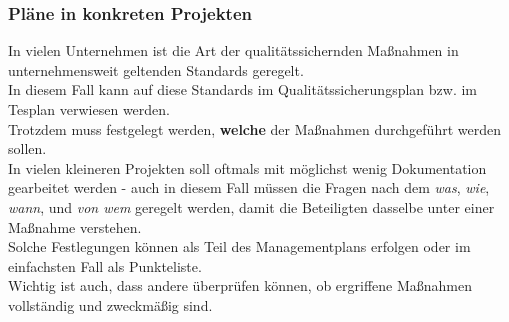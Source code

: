 \subsubsection*{Pläne in konkreten Projekten}
In vielen Unternehmen ist die Art der qualitätssichernden Maßnahmen in unternehmensweit geltenden Standards geregelt.\\
In diesem Fall kann auf diese Standards im Qualitätssicherungsplan bzw. im Tesplan verwiesen werden.\\
Trotzdem muss festgelegt werden, \textbf{welche} der Maßnahmen durchgeführt werden sollen.\\
In vielen kleineren Projekten soll oftmals mit möglichst wenig Dokumentation gearbeitet werden - auch in diesem Fall müssen die Fragen nach dem \textit{was}, \textit{wie}, \textit{wann}, und \textit{von wem} geregelt werden, damit die Beteiligten dasselbe unter einer Maßnahme verstehen.\\
Solche Festlegungen können als Teil des Managementplans erfolgen oder im einfachsten Fall als Punkteliste.\\
Wichtig ist auch, dass andere überprüfen können, ob ergriffene Maßnahmen vollständig und zweckmäßig sind.